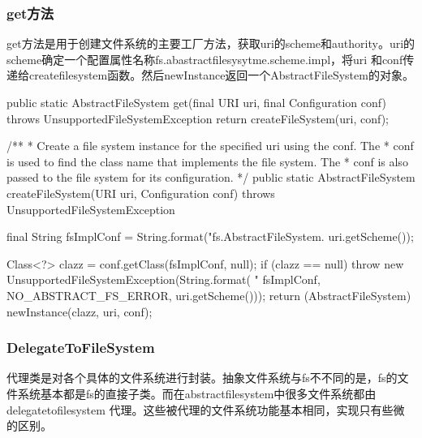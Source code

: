 \subsubsection{get方法}
get方法是用于创建文件系统的主要工厂方法，获取uri的scheme和authority。uri的scheme确定一个配置属性名称fs.abastractfilesysytme.scheme.impl，将uri 和conf传递给createfilesystem函数。然后newInstance返回一个AbstractFileSystem的对象。
\begin{java}
  public static AbstractFileSystem get(final URI uri, final Configuration conf)
      throws UnsupportedFileSystemException {
    return createFileSystem(uri, conf);
  }

    /**
   * Create a file system instance for the specified uri using the conf. The
   * conf is used to find the class name that implements the file system. The
   * conf is also passed to the file system for its configuration.
   */
  public static AbstractFileSystem createFileSystem(URI uri, Configuration conf)
      throws UnsupportedFileSystemException {
    final String fsImplConf = String.format("fs.AbstractFileSystem.%
        uri.getScheme());

    Class<?> clazz = conf.getClass(fsImplConf, null);
    if (clazz == null) {
      throw new UnsupportedFileSystemException(String.format(
          "%
          fsImplConf, NO_ABSTRACT_FS_ERROR, uri.getScheme()));
    }
    return (AbstractFileSystem) newInstance(clazz, uri, conf);
  }
\end{java}






\subsubsection{DelegateToFileSystem}
代理类是对各个具体的文件系统进行封装。抽象文件系统与fs不不同的是，fs的文件系统基本都是fs的直接子类。而在abstractfilesystem中很多文件系统都由delegatetofilesystem 代理。这些被代理的文件系统功能基本相同，实现只有些微的区别。
